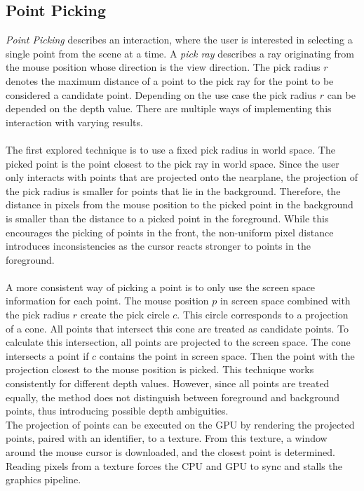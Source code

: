 \subsection{Point Picking}
\label{sec:pointPicking}

\textit{Point Picking} describes an interaction, where the user is interested in selecting a single point from the scene at a time. A \textit{pick ray} describes a ray originating from the mouse position whose direction is the view direction. The pick radius $r$ denotes the maximum distance of a point to the pick ray for the point to be considered a candidate point. Depending on the use case the pick radius $r$ can be depended on the depth value. There are multiple ways of implementing this interaction with varying results. 
\\
\\
The first explored technique is to use a fixed pick radius in world space. The picked point is the point closest to the pick ray in world space. Since the user only interacts with points that are projected onto the nearplane, the projection of the pick radius is smaller for points that lie in the background. Therefore, the distance in pixels from the mouse position to the picked point in the background is smaller than the distance to a picked point in the foreground. While this encourages the picking of points in the front, the non-uniform pixel distance introduces inconsistencies as the cursor reacts stronger to points in the foreground. 
\\
\\
A more consistent way of picking a point is to only use the screen space information for each point. The mouse position $p$ in screen space combined with the pick radius $r$ create the pick circle $c$. This circle corresponds to a projection of a cone. All points that intersect this cone are treated as candidate points. To calculate this intersection, all points are projected to the screen space. The cone intersects a point if $c$ contains the point in screen space. Then the point with the projection closest to the mouse position is picked. This technique works consistently for different depth values. However, since all points are treated equally, the method does not distinguish between foreground and background points, thus introducing possible depth ambiguities. 
\\
The projection of points can be executed on the GPU by rendering the projected points, paired with an identifier, to a texture. From this texture, a window around the mouse cursor is downloaded, and the closest point is determined. Reading pixels from a texture forces the CPU and GPU to sync and stalls the graphics pipeline. 
